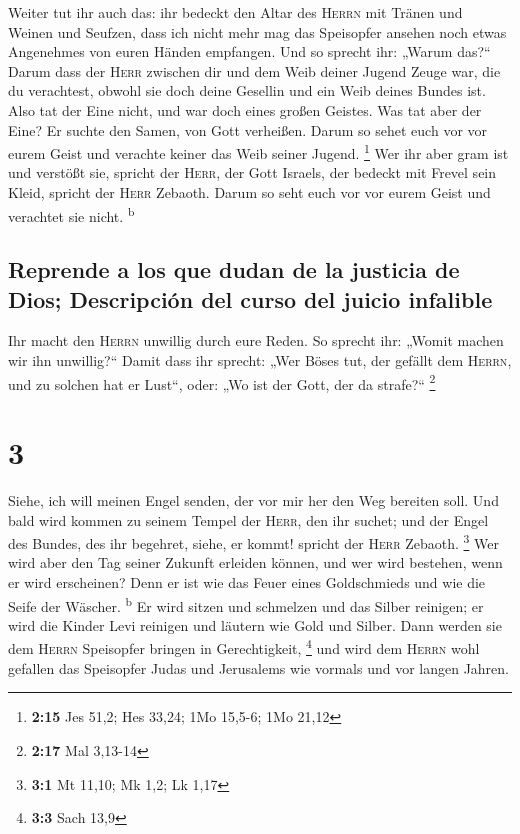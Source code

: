  Weiter tut ihr auch das: ihr bedeckt den Altar des
\textsc{Herrn} mit Tränen und Weinen und Seufzen, dass ich nicht mehr
mag das Speisopfer ansehen noch etwas Angenehmes von euren Händen
empfangen.  Und so sprecht ihr: „Warum das?{}`` Darum
dass der \textsc{Herr} zwischen dir und dem Weib deiner Jugend Zeuge
war, die du verachtest, obwohl sie doch deine Gesellin und ein Weib
deines Bundes ist.  Also tat der Eine nicht, und war doch
eines großen Geistes. Was tat aber der Eine? Er suchte den Samen, von
Gott verheißen. Darum so sehet euch vor vor eurem Geist und verachte
keiner das Weib seiner Jugend. \footnote{\textbf{2:15} Jes 51,2; Hes
  33,24; 1Mo 15,5-6; 1Mo 21,12}  Wer ihr aber gram ist
und verstößt sie, spricht der \textsc{Herr}, der Gott Israels, der
bedeckt mit Frevel sein Kleid, spricht der \textsc{Herr} Zebaoth. Darum
so seht euch vor vor eurem Geist und verachtet sie nicht.
\textsuperscript{b}

\hypertarget{reprende-a-los-que-dudan-de-la-justicia-de-dios-descripciuxf3n-del-curso-del-juicio-infalible}{%
\subsection{Reprende a los que dudan de la justicia de Dios; Descripción
del curso del juicio
infalible}\label{reprende-a-los-que-dudan-de-la-justicia-de-dios-descripciuxf3n-del-curso-del-juicio-infalible}}

 Ihr macht den \textsc{Herrn} unwillig durch eure Reden.
So sprecht ihr: „Womit machen wir ihn unwillig?{}`` Damit dass ihr
sprecht: „Wer Böses tut, der gefällt dem \textsc{Herrn}, und zu solchen
hat er Lust``, oder: „Wo ist der Gott, der da strafe?{}`` \footnote{\textbf{2:17}
  Mal 3,13-14}

\hypertarget{section-2}{%
\section{3}\label{section-2}}

 Siehe, ich will meinen Engel senden, der vor mir her den
Weg bereiten soll. Und bald wird kommen zu seinem Tempel der
\textsc{Herr}, den ihr suchet; und der Engel des Bundes, des ihr
begehret, siehe, er kommt! spricht der \textsc{Herr} Zebaoth.
\footnote{\textbf{3:1} Mt 11,10; Mk 1,2; Lk 1,17}  Wer
wird aber den Tag seiner Zukunft erleiden können, und wer wird bestehen,
wenn er wird erscheinen? Denn er ist wie das Feuer eines Goldschmieds
und wie die Seife der Wäscher. \textsuperscript{b}  Er
wird sitzen und schmelzen und das Silber reinigen; er wird die Kinder
Levi reinigen und läutern wie Gold und Silber. Dann werden sie dem
\textsc{Herrn} Speisopfer bringen in Gerechtigkeit, \footnote{\textbf{3:3}
  Sach 13,9}  und wird dem \textsc{Herrn} wohl gefallen
das Speisopfer Judas und Jerusalems wie vormals und vor langen Jahren.

